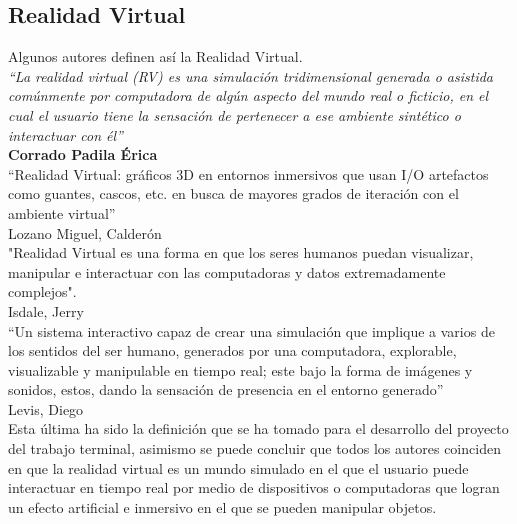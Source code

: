 \subsection{Realidad Virtual}
Algunos autores definen así la Realidad Virtual.\\
\newline
\textit{“La realidad virtual (RV) es una simulación tridimensional generada o asistida comúnmente por computadora de algún aspecto del mundo real o ficticio, en el cual 
el usuario tiene la sensación de pertenecer a ese ambiente sintético o interactuar con él”}\cite{web6}\\ 
\textbf{Corrado Padila Érica}\\
\newline
“Realidad Virtual: gráficos 3D en entornos inmersivos que usan I/O
artefactos como guantes, cascos, etc. en busca de mayores grados de iteración
con el ambiente virtual”\cite{web7}\\ 
Lozano Miguel, Calderón\\
\newline
"Realidad Virtual es una forma en que los seres humanos puedan
visualizar, manipular e interactuar con las computadoras y datos extremadamente
complejos".\cite{web8}\\
Isdale, Jerry\\
\newline
“Un sistema interactivo capaz de crear una simulación que implique a varios de los sentidos del ser humano, generados por una computadora, explorable, visualizable y manipulable 
en tiempo real; este bajo la forma de imágenes y sonidos, estos, dando la sensación de presencia en el entorno generado”\cite{web9}\\
Levis, Diego\\
\newline
Esta última ha sido la definición que se ha tomado para el desarrollo del proyecto del trabajo terminal, asimismo se puede concluir que todos los autores coinciden en que la 
realidad virtual es un mundo simulado en el que el usuario puede interactuar en tiempo real por medio
de dispositivos o computadoras que logran un efecto artificial e inmersivo en el que se pueden manipular objetos.

